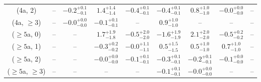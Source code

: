 \begin{table}[h!]
{\begin{tabular}{ccccccccc}
	(4a, 2) & -- & $-0.2^{+ 0.1 }_{- 0.1 }$ & $1.4^{+ 1.4 }_{- 1.4 }$ & $-0.4^{+ 0.1 }_{- 0.1 }$ & $-0.4^{+ 0.1 }_{- 0.1 }$ & $0.8^{+ 1.0 }_{- 1.0 }$ & $-0.0^{+ 0.0 }_{- 0.0 }$ & -- \\[0.5ex] 
	(4a, $\ge3$) & -- & $-0.0^{+ 0.0 }_{- 0.0 }$ & $-0.1^{+ 0.1 }_{- 0.1 }$ & -- & $0.9^{+ 1.0 }_{- 1.0 }$ & -- & -- & -- \\[0.5ex] 
	($\ge5$a, 0) & -- & -- & $1.7^{+ 1.9 }_{- 1.8 }$ & $-0.5^{+ 2.0 }_{- 2.0 }$ & $-1.6^{+ 1.9 }_{- 1.9 }$ & $2.1^{+ 2.0 }_{- 2.0 }$ & $-0.5^{+ 0.2 }_{- 0.2 }$ & -- \\[0.5ex] 
	($\ge5$a, 1) & -- & -- & $-0.3^{+ 0.2 }_{- 0.2 }$ & $-0.0^{+ 1.1 }_{- 1.1 }$ & $0.5^{+ 1.5 }_{- 1.5 }$ & $0.5^{+ 1.0 }_{- 1.0 }$ & $0.7^{+ 1.0 }_{- 1.0 }$ & -- \\[0.5ex] 
	($\ge5$a, 2) & -- & -- & $-0.0^{+ 0.0 }_{- 0.0 }$ & $-0.1^{+ 0.1 }_{- 0.1 }$ & $-0.3^{+ 0.1 }_{- 0.1 }$ & $-0.2^{+ 0.1 }_{- 0.1 }$ & $-0.1^{+ 0.0 }_{- 0.0 }$ & -- \\[0.5ex] 
	($\ge5$a, $\ge3$) & -- & -- & -- & -- & $-0.1^{+ 0.1 }_{- 0.1 }$ & $-0.0^{+ 0.0 }_{- 0.0 }$ & -- & -- \\[0.5ex] 
	\hline
	\hline
\end{tabular}}
\end{table}
